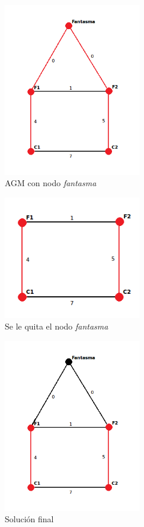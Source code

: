\documentclass[a4paper, 10pt, twoside]{article}
\begin{document}
\begin{figure}[H]
\centering
\includegraphics[width=60mm]{../ejemplo_graficos/CosoDosSubconjuntosConNodoFantasmaSolucion.png}
\caption{AGM con nodo \textit{fantasma}}
\label{3}
\end{figure} 

\begin{figure}[H]
\centering
\includegraphics[width=60mm]{../ejemplo_graficos/CosoDosSubconjuntosSolucion.png}
\caption{Se le quita el nodo \textit{fantasma}}
\label{4}
\end{figure} 

\begin{figure}[H]
\centering
\includegraphics[width=60mm]{../ejemplo_graficos/CosoDosSubconjuntosSolucionSinFantasma.png}
\caption{Solución final}
\label{5}
\end{figure} 
\end{document}
